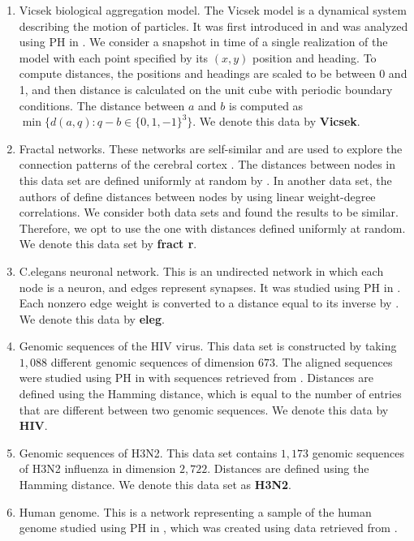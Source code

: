 \begin{enumerate}
    \item Vicsek biological aggregation model. The Vicsek model is a dynamical system describing the motion of particles.  
    It was first introduced in \cite{vicsek} and was analyzed using PH in \cite{TZH15}. We consider a snapshot in time of a single realization of the model with each point specified by its $(x,y)$ position and heading. To compute distances, the positions and headings are scaled to be between 0 and 1, and then distance is calculated on the unit cube with periodic boundary conditions. The distance between $a$ and $b$ is computed as $\min \{d(a,q) : q-b \in \{0,1,-1\}^3 \}$. We denote this data by \textbf{Vicsek}.  
    \item Fractal networks. These networks are self-similar and are used to explore the connection patterns of the cerebral cortex \cite{fractr}. The distances between nodes in this data set are defined uniformly at random by \cite{roadmap2017}. In another data set, the authors of \cite{roadmap2017} define distances between nodes by using linear weight-degree correlations. We consider both data sets and found the results to be similar. Therefore, we opt to use the one with distances defined uniformly at random.  
    We denote this data set by \textbf{fract r}.  
    \item C.elegans neuronal network. This is an undirected network in which each node is a neuron, and edges represent synapses. It was studied using PH in \cite{celegans}. Each nonzero edge weight is converted to a distance equal to its inverse by \cite{roadmap2017}.  
    We denote this data by \textbf{eleg}. 
    \item Genomic sequences of the HIV virus. This data set is constructed by taking $1,088$ different genomic sequences of dimension $673$. The aligned sequences were studied using PH in \cite{hiv} with sequences retrieved from \cite{HIVdata}. Distances are defined using the Hamming distance, which is equal to the number of entries that are different between two genomic sequences. We denote this data by \textbf{HIV}. 
    \item Genomic sequences of H3N2. This data set contains $1,173$ genomic sequences of H3N2 influenza in dimension $2,722$. Distances are defined using the Hamming distance. We denote this data set as \textbf{H3N2}.   
    \item Human genome. This is a network representing a sample of the human genome studied using PH in \cite{celegans}, which was created using data retrieved from \cite{genome}. 

\end{enumerate}
